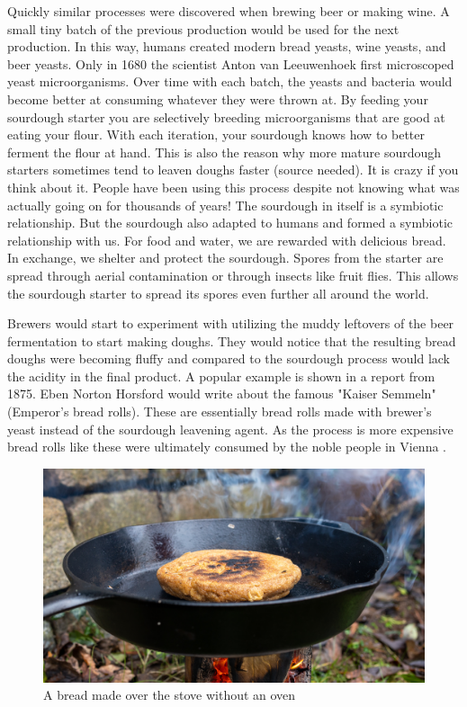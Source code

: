 Quickly similar processes were discovered when brewing beer
or making wine. A small tiny batch of the previous production
would be used for the next production. In this way, humans created
modern bread yeasts, wine yeasts, and beer yeasts. Only in 1680
the scientist Anton van Leeuwenhoek first microscoped yeast
microorganisms. Over time with each batch, the yeasts and bacteria
would become better at consuming whatever they were thrown at.
By feeding your sourdough starter you are selectively breeding
microorganisms that are good at eating your flour. With
each iteration, your sourdough knows how to better ferment the flour
at hand. This is also the reason why more mature sourdough starters sometimes
tend to leaven doughs faster (source needed). It is crazy if you
think about it. People have been using this process despite not
knowing what was actually going on for thousands of years! The
sourdough in itself is a symbiotic relationship. But the sourdough
also adapted to humans and formed a symbiotic relationship with us.
For food and water, we are rewarded with delicious bread. In exchange,
we shelter and protect the sourdough. Spores from the starter
are spread through aerial contamination or through insects like fruit flies.
This allows the sourdough starter to spread its spores even
further all around the world. 

Brewers would start to experiment with utilizing the muddy leftovers
of the beer fermentation to start making doughs. They would notice
that the resulting bread doughs were becoming fluffy and compared
to the sourdough process would lack the acidity in the final product.
A popular example is shown in a report from 1875. Eben Norton Horsford
would write about the famous "Kaiser Semmeln" (Emperor's bread rolls).
These are essentially bread rolls made with brewer's yeast instead
of the sourdough leavening agent. As the process is more expensive
bread rolls like these were ultimately consumed by the noble people
in Vienna \cite{vienna+breadrolls}.

\begin{figure}[h]
  \includegraphics[width=\textwidth]{sourdough-stove}
  \caption{A bread made over the stove without an oven}
  \label{sourdough-stove}
\end{figure}

